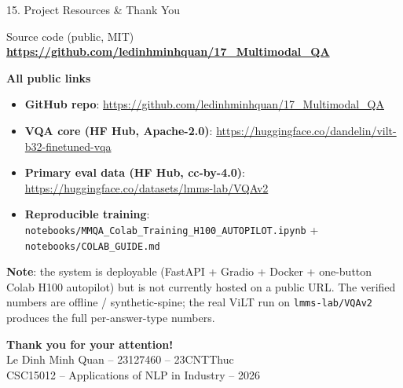 \documentclass[10pt,aspectratio=169]{beamer}
\begin{document}
\begin{frame}{15. Project Resources \& Thank You}
\begin{block}{Source code (public, MIT)}
\centering
\large \textbf{\url{https://github.com/ledinhminhquan/17_Multimodal_QA}}
\end{block}

\textbf{All public links}
\begin{itemize}\scriptsize
  \item \textbf{GitHub repo}: \tiny\url{https://github.com/ledinhminhquan/17_Multimodal_QA}
  \item \textbf{VQA core (HF Hub, Apache-2.0)}: \tiny\url{https://huggingface.co/dandelin/vilt-b32-finetuned-vqa}
  \item \textbf{Primary eval data (HF Hub, cc-by-4.0)}: \tiny\url{https://huggingface.co/datasets/lmms-lab/VQAv2}
  \item \textbf{Reproducible training}: \tiny\texttt{notebooks/MMQA\_Colab\_Training\_H100\_AUTOPILOT.ipynb} + \texttt{notebooks/COLAB\_GUIDE.md}
\end{itemize}

\vspace{0.2cm}
\scriptsize \textbf{Note}: the system is deployable (FastAPI + Gradio + Docker + one-button Colab H100 autopilot) but is not currently hosted on a public URL. The verified numbers are offline / synthetic-spine; the real ViLT run on \texttt{lmms-lab/VQAv2} produces the full per-answer-type numbers.

\vspace{0.3cm}
\centering
\Large\textbf{Thank you for your attention!}\\[0.2cm]
\normalsize Le Dinh Minh Quan -- 23127460 -- 23CNTThuc \\
\small CSC15012 -- Applications of NLP in Industry -- 2026
\end{frame}
\end{document}
